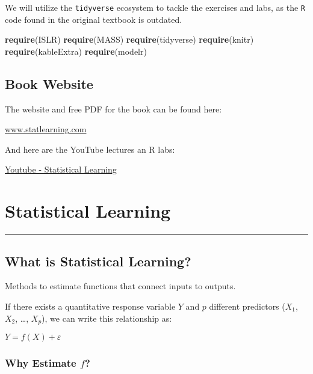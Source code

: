\documentclass[]{book}
\newenvironment{Shaded}{\begin{snugshade}}{\end{snugshade}}
\newcommand{\KeywordTok}[1]{\textcolor[rgb]{0.13,0.29,0.53}{\textbf{#1}}}
\newcommand{\NormalTok}[1]{#1}
\begin{document}
We will utilize the \texttt{tidyverse} ecosystem to tackle the exercises and labs, as the \texttt{R} code found in the original textbook is outdated.

\begin{Shaded}
\begin{Highlighting}[]
\KeywordTok{require}\NormalTok{(ISLR)}
\KeywordTok{require}\NormalTok{(MASS)}
\KeywordTok{require}\NormalTok{(tidyverse)}
\KeywordTok{require}\NormalTok{(knitr)}
\KeywordTok{require}\NormalTok{(kableExtra)}
\KeywordTok{require}\NormalTok{(modelr)}
\end{Highlighting}
\end{Shaded}

\hypertarget{book-website}{%
\section{Book Website}\label{book-website}}

The website and free PDF for the book can be found here:

\href{http://www-bcf.usc.edu/~gareth/ISL/}{www.statlearning.com}

And here are the YouTube lectures an R labs:

\href{https://www.youtube.com/channel/UC4OWDcPB1peiBXDfCSZ3h-w}{Youtube - Statistical Learning}

\hypertarget{statistical-learning}{%
\chapter{Statistical Learning}\label{statistical-learning}}

\begin{center}\rule{0.5\linewidth}{\linethickness}\end{center}

\hypertarget{what-is-statistical-learning}{%
\section{What is Statistical Learning?}\label{what-is-statistical-learning}}

Methods to estimate functions that connect inputs to outputs.

If there exists a quantitative response variable \(Y\) and \(p\) different predictors (\(X_1\), \(X_2\), \ldots{}, \(X_p\)), we can write this relationship as:

\(Y = f(X) + ε\)

\hypertarget{why-estimate-f}{%
\subsection{\texorpdfstring{Why Estimate \emph{\(f\)}?}{Why Estimate f?}}\label{why-estimate-f}}
\end{document}
